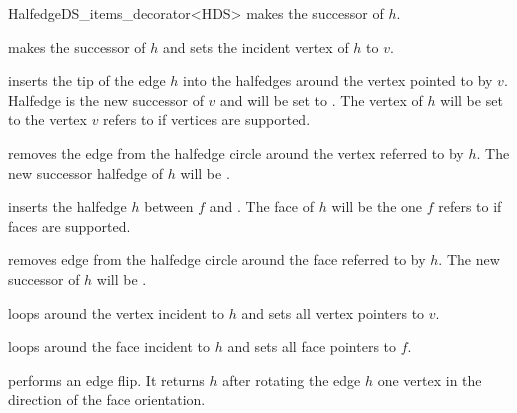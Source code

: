 \begin{ccRefClass}{HalfedgeDS_items_decorator<HDS>}
    {makes  the successor of $h$.}

    {makes  the successor of $h$ and sets the
    incident vertex of $h$ to $v$.}

    {inserts the tip of the edge $h$ into the halfedges around the vertex 
    pointed to by $v$. Halfedge  is the new successor of 
    $v$ and  will be set to . The vertex of $h$
    will be set to the vertex $v$ refers to if vertices are supported.}

   {removes the edge  from the halfedge
   circle around the vertex referred to by $h$. The new successor
   halfedge of $h$ will be  .}

    {inserts the halfedge $h$ between $f$ and .
    The face of $h$ will be the one $f$ refers to if faces
    are supported.}

   {removes edge  from the halfedge circle around 
    the face referred to by $h$. The new successor of $h$ will be 
    .}

\vspace*{-1mm}
   {loops around the vertex incident to $h$ and sets all vertex
    pointers to $v$. }

\vspace*{-1mm}
   {loops around the face incident to $h$ and sets all face 
    pointers to $f$. }

   {performs an edge flip. It returns $h$ after rotating the edge $h$ one
    vertex in the direction of the face orientation. 
    }

\vspace*{-2mm}


\end{ccRefClass}

